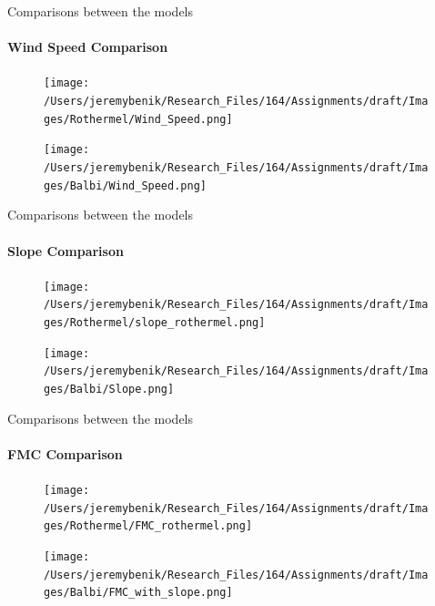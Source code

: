 \documentclass{beamer}
\begin{document}
\begin{frame} {Comparisons between the models}
\framesubtitle{Wind Speed Comparison}
\begin{figure}
\centering
\begin{minipage}{.5\textwidth}
  \centering
  \texttt{[image: /Users/jeremybenik/Research\_Files/164/Assignments/draft/Images/Rothermel/Wind\_Speed.png]}
  \label{fig:test1}
\end{minipage}%
\begin{minipage}{.5\textwidth}
  \centering
  \texttt{[image: /Users/jeremybenik/Research\_Files/164/Assignments/draft/Images/Balbi/Wind\_Speed.png]}
  \label{fig:test2}
\end{minipage}
\end{figure}
\end{frame}


\begin{frame} {Comparisons between the models}
\framesubtitle{Slope Comparison}
\begin{figure}
\centering
\begin{minipage}{.5\textwidth}
  \centering
  \texttt{[image: /Users/jeremybenik/Research\_Files/164/Assignments/draft/Images/Rothermel/slope\_rothermel.png]}
  \label{fig:test1}
\end{minipage}%
\begin{minipage}{.5\textwidth}
  \centering
  \texttt{[image: /Users/jeremybenik/Research\_Files/164/Assignments/draft/Images/Balbi/Slope.png]}
  \label{fig:test2}
\end{minipage}
\end{figure}
\end{frame}


\begin{frame} {Comparisons between the models}
\framesubtitle{FMC Comparison}
\begin{figure}
\centering
\begin{minipage}{.5\textwidth}
  \centering
  \texttt{[image: /Users/jeremybenik/Research\_Files/164/Assignments/draft/Images/Rothermel/FMC\_rothermel.png]}
  \label{fig:test1}
\end{minipage}%
\begin{minipage}{.5\textwidth}
  \centering
  \texttt{[image: /Users/jeremybenik/Research\_Files/164/Assignments/draft/Images/Balbi/FMC\_with\_slope.png]}
  \label{fig:test2}
\end{minipage}
\end{figure}
\end{frame}
\end{document}
